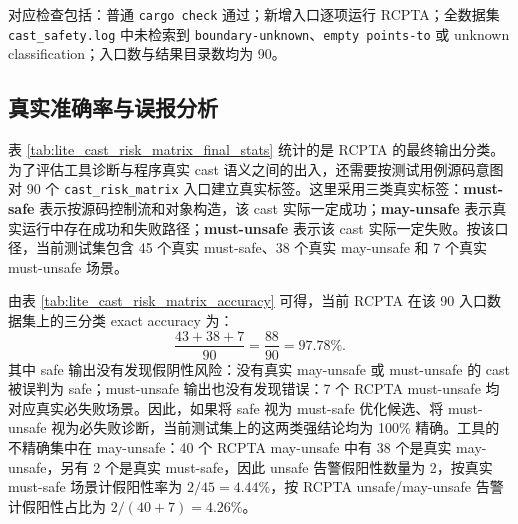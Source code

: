 \documentclass[10.5pt,compsoc,UTF8]{cjc}
\theoremstyle{mystyle}
\begin{document}
对应检查包括：普通 \texttt{cargo check} 通过；新增入口逐项运行 RCPTA；全数据集 \texttt{cast\_safety.log} 中未检索到 \texttt{boundary-unknown}、\texttt{empty points-to} 或 unknown classification；入口数与结果目录数均为 90。

\subsection{真实准确率与误报分析}

表 \ref{tab:lite_cast_risk_matrix_final_stats} 统计的是 RCPTA 的最终输出分类。为了评估工具诊断与程序真实 cast 语义之间的出入，还需要按测试用例源码意图对 90 个 \texttt{cast\_risk\_matrix} 入口建立真实标签。这里采用三类真实标签：\textbf{must-safe} 表示按源码控制流和对象构造，该 cast 实际一定成功；\textbf{may-unsafe} 表示真实运行中存在成功和失败路径；\textbf{must-unsafe} 表示该 cast 实际一定失败。按该口径，当前测试集包含 45 个真实 must-safe、38 个真实 may-unsafe 和 7 个真实 must-unsafe 场景。

\begin{table}[H]
\centering
{}
\caption{Cast Risk Matrix 真实标签与 RCPTA 输出对照}
\label{tab:lite_cast_risk_matrix_accuracy}
\end{table}

由表 \ref{tab:lite_cast_risk_matrix_accuracy} 可得，当前 RCPTA 在该 90 入口数据集上的三分类 exact accuracy 为：
\[
    \frac{43+38+7}{90}=\frac{88}{90}=97.78\%.
\]
其中 safe 输出没有发现假阴性风险：没有真实 may-unsafe 或 must-unsafe 的 cast 被误判为 safe；must-unsafe 输出也没有发现错误：7 个 RCPTA must-unsafe 均对应真实必失败场景。因此，如果将 safe 视为 must-safe 优化候选、将 must-unsafe 视为必失败诊断，当前测试集上的这两类强结论均为 100\% 精确。工具的不精确集中在 may-unsafe：40 个 RCPTA may-unsafe 中有 38 个是真实 may-unsafe，另有 2 个是真实 must-safe，因此 unsafe 告警假阳性数量为 2，按真实 must-safe 场景计假阳性率为 \(2/45=4.44\%\)，按 RCPTA unsafe/may-unsafe 告警计假阳性占比为 \(2/(40+7)=4.26\%\)。
\end{document}
